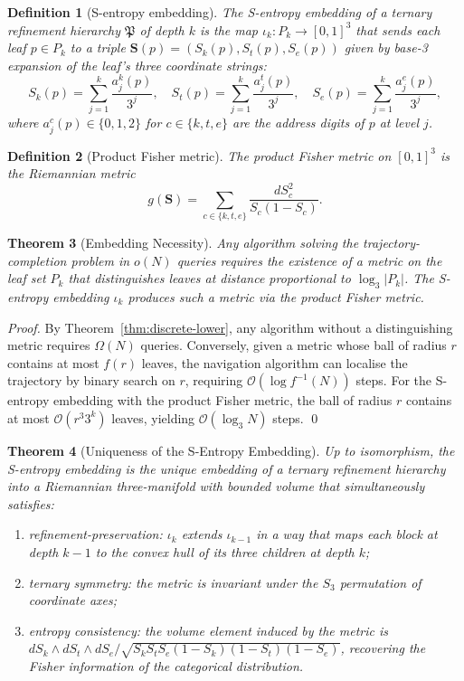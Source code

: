 \documentclass[twocolumn,a4paper]{article}
\newtheorem{theorem}{Theorem}[section]
\newtheorem{definition}[theorem]{Definition}
\newcommand{\Sk}{S_{k}}
\newcommand{\St}{S_{t}}
\newcommand{\Se}{S_{e}}
\newcommand{\Stuple}{\mathbf{S}}
\newcommand{\PPart}{\mathfrak{P}}
\begin{document}
\begin{definition}[S-entropy embedding]
\label{def:s-embed}
The \emph{S-entropy embedding} of a ternary refinement hierarchy $\PPart$ of depth $k$ is the map $\iota_{k}\colon P_{k}\to[0,1]^{3}$ that sends each leaf $p\in P_{k}$ to a triple $\Stuple(p)=(\Sk(p),\St(p),\Se(p))$ given by base-3 expansion of the leaf's three coordinate strings:
\[
\Sk(p)=\sum_{j=1}^{k}\frac{a_{j}^{k}(p)}{3^{j}},\quad
\St(p)=\sum_{j=1}^{k}\frac{a_{j}^{t}(p)}{3^{j}},\quad
\Se(p)=\sum_{j=1}^{k}\frac{a_{j}^{e}(p)}{3^{j}},
\]
where $a_{j}^{c}(p)\in\{0,1,2\}$ for $c\in\{k,t,e\}$ are the address digits of $p$ at level $j$.
\end{definition}

\begin{definition}[Product Fisher metric]
\label{def:fisher-metric}
The \emph{product Fisher metric} on $[0,1]^{3}$ is the Riemannian metric
\[
g(\Stuple)=\sum_{c\in\{k,t,e\}}\frac{dS_{c}^{2}}{S_{c}(1-S_{c})}.
\]
\end{definition}

\begin{theorem}[Embedding Necessity]
\label{thm:embedding-necessity}
Any algorithm solving the trajectory-completion problem in $o(N)$ queries requires the existence of a metric on the leaf set $P_{k}$ that distinguishes leaves at distance proportional to $\log_{3}|P_{k}|$. The S-entropy embedding $\iota_{k}$ produces such a metric via the product Fisher metric.
\end{theorem}

\begin{proof}
By Theorem~\ref{thm:discrete-lower}, any algorithm without a distinguishing metric requires $\Omega(N)$ queries. Conversely, given a metric whose ball of radius $r$ contains at most $f(r)$ leaves, the navigation algorithm can localise the trajectory by binary search on $r$, requiring $\mathcal{O}(\log f^{-1}(N))$ steps. For the S-entropy embedding with the product Fisher metric, the ball of radius $r$ contains at most $\mathcal{O}(r^{3}3^{k})$ leaves, yielding $\mathcal{O}(\log_{3}N)$ steps. \qed
\end{proof}

\begin{theorem}[Uniqueness of the S-Entropy Embedding]
\label{thm:s-uniqueness}
Up to isomorphism, the S-entropy embedding is the unique embedding of a ternary refinement hierarchy into a Riemannian three-manifold with bounded volume that simultaneously satisfies:
\begin{enumerate}[nosep,label=(\roman*)]
\item refinement-preservation: $\iota_{k}$ extends $\iota_{k-1}$ in a way that maps each block at depth $k-1$ to the convex hull of its three children at depth $k$;
\item ternary symmetry: the metric is invariant under the $S_{3}$ permutation of coordinate axes;
\item entropy consistency: the volume element induced by the metric is $dS_{k}\wedge dS_{t}\wedge dS_{e}/\sqrt{S_{k}S_{t}S_{e}(1-S_{k})(1-S_{t})(1-S_{e})}$, recovering the Fisher information of the categorical distribution.
\end{enumerate}
\end{theorem}
\end{document}
